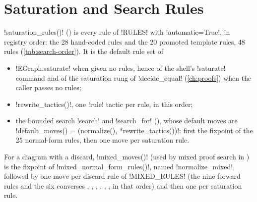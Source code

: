 \section{Saturation and Search Rules}\label{sec:app-rules-saturation}

\py!saturation_rules()! () is every rule of \py!RULES! with \py!automatic=True!, in registry order: the 28 hand-coded rules and the 20 promoted template rules, 48 rules (\cref{tab:search-order}). It is the default rule set of
\begin{itemize}
\item \py!EGraph.saturate! when given no rules, hence of the shell's \azx!saturate! command and of the saturation rung of \py!decide_equal! (\cref{ch:proofs}) when the caller passes no rules;
\item \py!rewrite_tactics()!, one \py!rule! tactic per rule, in this order;
\item the bounded search \py!search! and \py!search_for! (), whose default moves are \py!default_moves() = (normalize(), *rewrite_tactics())!: first the fixpoint of the 25 normal-form rules, then one move per saturation rule.
\end{itemize}
For a diagram with a discard, \py!mixed_moves()! (used by mixed proof search in ) is the fixpoint of \py!mixed_normal_form_rules()!, named \code!normalize_mixed!, followed by one move per discard rule of \py!MIXED_RULES! (the nine forward rules and the six converses , , , , , , in that order) and then one per saturation rule.

